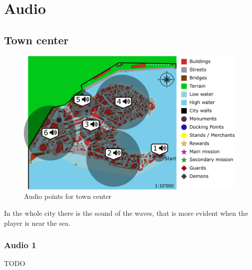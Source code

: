 \section{Audio}

\subsection{Town center}
\begin{figure}[H]
  \centering
  \includegraphics[width=\textwidth]{Images/Maps/dynamiaAudio}
  \caption{Audio points for town center}
\end{figure}

In the whole city there is the sound of the waves, that is more evident when the player is near the sea.

\subsubsection*{Audio 1}
TODO

